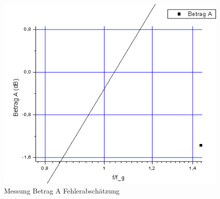 \documentclass[12pt,a4paper]{article}
\begin{document}
\begin{figure}[H]
	\centering
	\includegraphics[scale=0.60]{./figure/betrag_a_zoom.png}
	\caption{Messung Betrag A Fehlerabschätzung}
	\label{fig:betraga_abweichung}
\end{figure}
\end{document}
